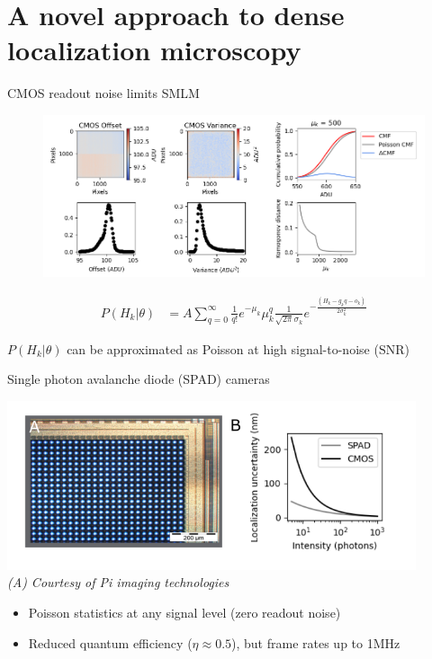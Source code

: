 \documentclass{beamer}					%
\begin{document}
\section{A novel approach to dense localization microscopy}

\begin{frame}{CMOS readout noise limits SMLM}

\begin{figure}
\includegraphics[width=13cm]{Noise.png}
\end{figure}

\begin{align}
P(H_{k}|\theta) &=  A\sum_{q=0}^{\infty} \frac{1}{q!}e^{-\mu_{k}}\mu_{k}^{q}\frac{1}{\sqrt{2\pi}\sigma_{k}}e^{-\frac{(H_{k}-g_{k}q-o_{k})}{2\sigma_{k}^{2}}}
\end{align}


$P(H_{k}|\theta)$ can be approximated as Poisson at high signal-to-noise ($\mathrm{SNR}$)
 
\end{frame}

\begin{frame}{Single photon avalanche diode (SPAD) cameras}

\includegraphics[width=12cm]{SPAD-Intro.png}\\
\textit{(A) Courtesy of Pi imaging technologies}
\begin{itemize}
\item Poisson statistics at any signal level (zero readout noise)
\item Reduced quantum efficiency ($\eta\approx 0.5$), but frame rates up to 1MHz
\end{itemize}


\end{frame}
\end{document}
